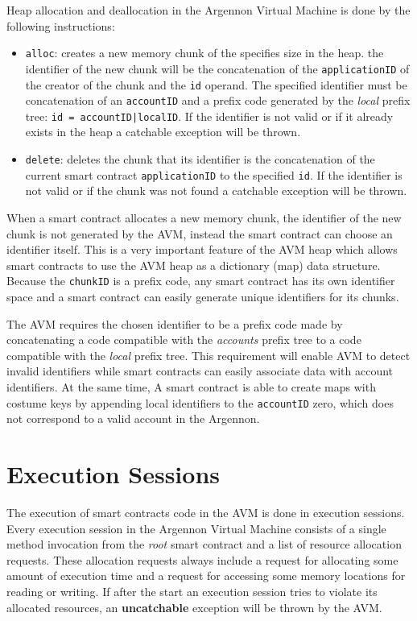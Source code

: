 Heap allocation and deallocation in the Argennon Virtual Machine is done by the following instructions:

\begin{itemize}
    \item \texttt{alloc}: creates a new memory chunk of the specifies size in the heap. the identifier
    of the new chunk will be the concatenation of the \texttt{applicationID} of the creator of the chunk and
    the \texttt{id} operand. The specified identifier must be concatenation of
    an \texttt{accountID} and a prefix code
    generated by the \emph{local} prefix tree: \texttt{id = accountID|localID}. If the identifier is not valid or
    if it already exists in the heap a catchable exception will be thrown.

    \item \texttt{delete}: deletes the chunk that its identifier is the concatenation of the current smart
    contract \texttt{applicationID} to the specified \texttt{id}. If the identifier is not valid or
    if the chunk was not found a catchable exception will be thrown.
\end{itemize}

When a smart contract allocates a new memory chunk, the identifier of the new chunk is not generated by
the AVM, instead the smart contract can choose an identifier itself. This is a very important feature of
the AVM heap which allows smart contracts to use the AVM heap as a dictionary (map) data structure.
Because the \texttt{chunkID} is a prefix code, any smart contract has its own identifier space and a smart contract
can easily generate unique identifiers for its chunks.

The AVM requires the chosen identifier to be a prefix code made by concatenating a code compatible with
the \emph{accounts} prefix tree to a code compatible with the \emph{local} prefix tree. This requirement will
enable AVM to detect invalid identifiers while smart contracts can easily associate data with account identifiers.
At the same time, A smart contract is able to create maps with costume keys by appending local identifiers
to the \texttt{accountID} zero, which does not correspond to a valid account in the Argennon.


\section{Execution Sessions}\label{sec:execution-sessions}

The execution of smart contracts code in the AVM is done in execution sessions. Every execution session in the
Argennon Virtual Machine consists of a single method invocation from the \emph{root} smart contract and a list
of resource allocation requests. These allocation requests always include a request for allocating some amount
of execution time and a request for accessing some memory locations for reading or writing. If after the start
an execution session tries to violate its allocated resources, an \textbf{uncatchable} exception will
be thrown by the AVM\@.


